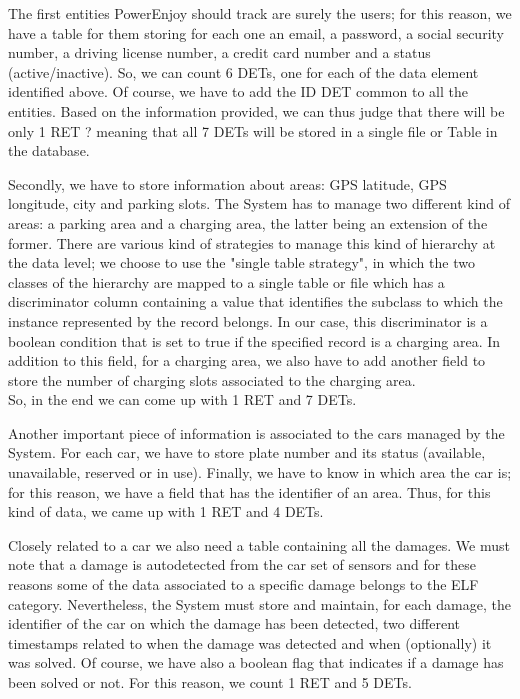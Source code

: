 The first entities PowerEnjoy should track are surely the users; for this reason, we have a table for them storing for each one an email, a password, a social security number, a driving license number, a credit card number and a status (active/inactive). 
So, we can count 6 DETs, one for each of the data element identified above. Of course, we have to add the ID DET common to all the entities. Based on the information provided, we can thus judge that there will be only 1 RET ? meaning that all 7 DETs will be stored in a single file or Table in the database.
\smallskip

Secondly, we have to store information about areas: GPS latitude, GPS longitude, city and parking slots. The System has to manage two different kind of areas: a parking area and a charging area, the latter being an extension of the former. There are various kind of strategies to manage this kind of hierarchy at the data level; we choose to use the "single table strategy", in which the two classes of the hierarchy are mapped to a single table or file which has a discriminator column containing a value that identifies the subclass to which the instance represented by the record belongs. In our case, this discriminator is a boolean condition that is set to true if the specified record is a charging area. In addition to this field, for a charging area, we also have to add another field to store the number of charging slots associated to the charging area.\\
So, in the end we can come up with 1 RET and 7 DETs.
\smallskip

Another important piece of information is associated to the cars managed by the System. For each car, we have to store plate number and its status (available, unavailable, reserved or in use). Finally, we have to know in which area the car is; for this reason, we have a field that has the identifier of an area. Thus, for this kind of data, we came up with 1 RET and 4 DETs.
\smallskip

Closely related to a car we also need a table containing all the damages. We must note that a damage is autodetected from the car set of sensors and for these reasons some of the data associated to a specific damage belongs to the ELF category. Nevertheless, the System must store and maintain, for each damage, the identifier of the car on which the damage has been detected, two different timestamps related to when the damage was detected and when (optionally) it was solved. Of course, we have also a boolean flag that indicates if a damage has been solved or not. For this reason, we count 1 RET and 5 DETs. 
\smallskip

